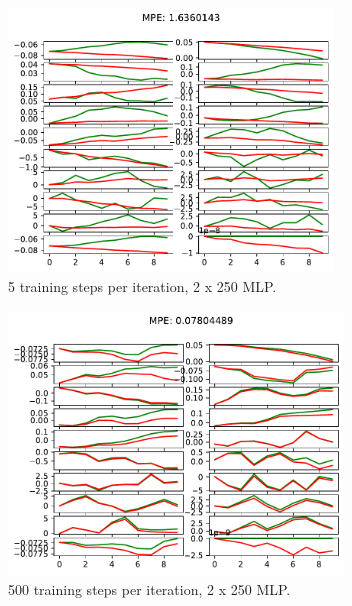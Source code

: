 \documentclass{article}
\begin{document}
\begin{answer}[title=Plot,height=9.5cm,width=\linewidth]
    \begin{figure}[H]
        \centering
        \includegraphics[height=7cm]{figs/P1_2.pdf}
        \caption{5 training steps per iteration, 2 x 250 MLP.}
    \end{figure}
\end{answer}

\begin{answer}[title=Plot,height=9.5cm,width=\linewidth]
    \begin{figure}[H]
        \centering
        \includegraphics[height=7cm]{figs/P1_3.pdf}
        \caption{500 training steps per iteration, 2 x 250 MLP.}
    \end{figure}
\end{answer}
\end{document}
